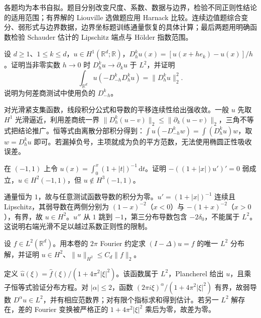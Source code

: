 \BookExercises

各题均为本书自拟。题目分别改变尺度、系数、数据与边界，检验不同正则性结论的适用范围；有界解的 Liouville 选做题应用 Harnack 比较。连续边值题综合变分、弱形式与边界数据，边界坐标题训练通量恢复的具体计算；最后两题用明确函数检验 Schauder 估计的 Lipschitz 端点与 Hölder 指数范围。

\begin{exercise}\label{b2:ex:16-discrete-energy}
设 \(d\ge1\)、\(1\le k\le d\)，\(u\in H^1(\mathbb R^d;\mathbb R)\)，\(D_h^ku(x)=[u(x+he_k)-u(x)]/h\)。证明当非零实数 \(h\to0\) 时 \(D_h^ku\to\partial_ku\) 于 \(L^2\)，并证明
\[\int_{\mathbb R^d}u(-D_{-h}^kD_h^ku)=\lVert D_h^ku\rVert_2^2.\]
说明为何差商测试中使用负的 \(D_{-h}^k\)。
\end{exercise}
\begin{solution}
对光滑紧支集函数，线段积分公式和导数的平移连续性给出强收敛。一般 \(u\) 先取 \(H^1\) 光滑逼近，利用差商统一界 \(\lVert D_h^k(u-v)\rVert_2\le\lVert\partial_k(u-v)\rVert_2\)，三角不等式把结论推广。恒等式由离散分部积分得到：\(\int u(-D_{-h}^kw)=\int(D_h^ku)w\)，取 \(w=D_h^ku\) 即可。若漏掉负号，主项就成为负的平方范数，无法使用椭圆正性吸收误差。
\end{solution}

\begin{exercise}\label{b2:ex:16-lipschitz-not-h3}
在 \((-1,1)\) 上令 \(u(x)=\int_0^x(1+|t|)^{-1}\,\mathrm dt\)。证明 \(-((1+|x|)u')'=0\) 弱成立，\(u\in H^2(-1,1)\)，但 \(u\notin H^3(-1,1)\)。
\end{exercise}
\begin{solution}
通量恒为 \(1\)，故与任意测试函数导数的积分为零。\(u'=(1+|x|)^{-1}\) 连续且 Lipschitz，其弱导数在两侧分别为 \((1-x)^{-2}\)（\(x<0\)）与 \(-(1+x)^{-2}\)（\(x>0\)），有界，故 \(u\in H^2\)。\(u''\) 从 \(1\) 跳到 \(-1\)，第三分布导数包含 \(-2\delta_0\)，不能属于 \(L^2\)。这说明右端光滑不足以越过系数正则性的限制。
\end{solution}

\begin{exercise}\label{b2:ex:16-fourier-h2}
设 \(f\in L^2(\mathbb R^d)\)。用本卷的 \(2\pi\) Fourier 约定求 \((I-\Delta)u=f\) 的唯一 \(L^2\) 分布解，并证明 \(u\in H^2\)、\(\lVert u\rVert_{H^2}\le C_d\lVert f\rVert_2\)。
\end{exercise}
\begin{solution}
定义 \(\widehat u(\xi)=\widehat f(\xi)/(1+4\pi^2|\xi|^2)\)。该函数属于 \(L^2\)，Plancherel 给出 \(u\)，且乘子恒等式验证分布方程。对 \(|\alpha|\le2\)，函数 \((2\pi i\xi)^\alpha/(1+4\pi^2|\xi|^2)\) 有界，故弱导数 \(D^\alpha u\in L^2\)，并有相应范数界；对有限个指标求和得到估计。若另一 \(L^2\) 解存在，差的 Fourier 变换被严格正的 \(1+4\pi^2|\xi|^2\) 乘后为零，故差为零。
\end{solution}

